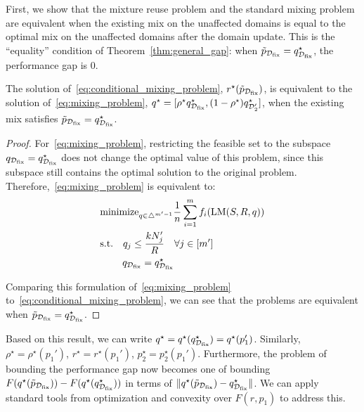 First, we show that the mixture reuse problem and the standard mixing problem are equivalent when the existing mix on the unaffected domains is equal to the optimal mix on the unaffected domains after the domain update. This is the ``equality'' condition of Theorem~\ref{thm:general_gap}: when $\tilde{p}_{\mathcal{D}_{\text{fix}}} = q^\star_{\mathcal{D}_{\text{fix}}}$, the performance gap is $0$.


\begin{lemma}\label{lemma:conditional_standard_equivalence}
The solution of~\eqref{eq:conditional_mixing_problem}, $r^\star(\tilde{p}_{\mathcal{D}_{\text{fix}}})$, is equivalent to the solution of~\eqref{eq:mixing_problem}, $q^\star = [\rho^\star q^\star_{\mathcal{D}_{\text{fix}}}, (1 - \rho^\star) q^\star_{\mathcal{D}_2'}]$, when the existing mix satisfies $\tilde{p}_{\mathcal{D}_{\text{fix}}} = q^\star_{\mathcal{D}_{\text{fix}}}$. 
\end{lemma}


\begin{proof}
For~\eqref{eq:mixing_problem}, restricting the feasible set to the subspace $q_{\mathcal{D}_{\text{fix}}} = q^\star_{\mathcal{D}_{\text{fix}}}$ does not change the optimal value of this problem, since this subspace still contains the optimal solution to the original problem. Therefore,~\eqref{eq:mixing_problem} is equivalent to:
\begin{align*}
    &\text{minimize}_{q \in \triangle^{m'-1}}  \frac{1}{n} \sum_{i = 1}^m f_i(\text{LM}(S, R, q)) \\
    &\text{s.t.} \quad  q_j \le \frac{k N_j'}{R} \quad \forall j \in [m'] \nonumber \\
    &  \qquad \; q_{\mathcal{D}_{\text{fix}}} = q^\star_{\mathcal{D}_{\text{fix}}} \nonumber 
\end{align*}

Comparing this formulation of~\eqref{eq:mixing_problem} to~\eqref{eq:conditional_mixing_problem}, we can see that the problems are equivalent when $\tilde{p}_{\mathcal{D}_{\text{fix}}} = q^\star_{\mathcal{D}_{\text{fix}}}$.
\end{proof}



Based on this result, we can write $q^\star = q^\star(q_{\mathcal{D}_{\text{fix}}}^\star) = q^\star(p_1')$. Similarly, $\rho^\star = \rho^\star(p_1')$, $r^\star = r^\star(p_1')$, $p_2^\star = p_2^\star(p_1')$. Furthermore, the problem of bounding the performance gap now becomes one of bounding $F(q^\star(\tilde{p}_{\mathcal{D}_{\text{fix}}})) - F(q^\star(q^\star_{\mathcal{D}_{\text{fix}}}))$ in terms of $\|q^\star(\tilde{p}_{\mathcal{D}_{\text{fix}}}) - q^\star_{\mathcal{D}_{\text{fix}}} \|$. We can apply standard tools from optimization and convexity over $F(r, p_1)$ to address this.



